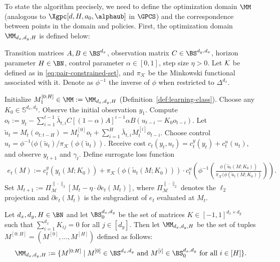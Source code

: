 To state the algorithm precisely, we need to define the optimization domain $\MM$ (analogous to $\Xgpc[d,H,a_0,\alphaub]$ in $\GPCS$) and the correspondence between points in the domain and policies. First, the optimization domain $\MM_{d_x,d_y,H}$ is defined below:


\begin{algorithm}[t]
\caption{$\GPCPOS$}
\label{alg:gpc-po}
\begin{algorithmic}[1]
\REQUIRE Transition matrices $A,B \in \BS^{d_x}$, observation matrix $C \in \BS^{d_y,d_x}$, horizon parameter $H \in \BN$, control parameter $\alpha\in[0,1]$, step size $\eta>0$.  Let $\mathcal{K}$ be defined as in \cref{eq:pair-constrained-set}, and $\pi_{\mathcal{K}}$ be the Minkowski functional associated with it.  
Denote as $\phi^{-1}$ the inverse of $\phi$ when restricted to $\Delta^{d_x}$.

\STATE Initialize $M_1^{[0:H]}\in \MM := \MM_{d_x,d_y,H}$ (Definition~\ref{def:learning-class}). Choose any $K_0\in\mathbb{S}^{d_x,d_y}$. \label{line:choose-k0}
\STATE Observe the initial observation $y_1$.
    \STATE Compute $o_t := y_t-\sum_{i=1}^{t-1}\bar{\lambda}_{t,i}C[(1-\alpha)A]^{i-1}\alpha B(u_{t-i}-K_0 o_{t-i})$. \label{line:compute-signal}
    \STATE Let $\tilde{u}_t=M_t(o_{t:t-H})=M_{t}^{[0]}o_t+\sum_{i=1}^H \bar{\lambda}_{t,i}M_{t}^{[i]}o_{t-i}$.\label{line:control-po-utot}
    \STATE Choose control $u_t=\phi^{-1}(\phi(\tilde{u}_t)/\pi_{\mathcal{K}}(\phi(\tilde{u}_t))$.\label{line:control-po}
    \STATE Receive cost $c_t(y_t,u_t)=c_t^y(y_t)+c_t^u(u_t)$, and observe $y_{t+1}$ and $\gamma_t$.
    \STATE Define surrogate loss function 
\begin{align*}
e_t(M) := c_t^y(y_t(M; K_0))+ \pi_{\mathcal{K}}(\phi(\tilde{u}_t(M;K_0))) \cdot c_t^u\left(\phi^{-1}\left(\frac{\phi(\tilde{u}_t(M;K_0))}{\pi_{\mathcal{K}}(\phi(\tilde{u}_t(M;K_0))}\right)\right).
\end{align*} \label{line:et-loss}
    \STATE Set $M_{t+1} := \Pi_{\mathcal{M}}^{\|\cdot\|_2}\left[M_t-\eta \cdot \partial e_t(M_t)\right]$, where $\Pi_{\mathcal{M}}^{\|\cdot\|_2}$ denotes the $\ell_2$ projection and $\partial e_t(M_t)$ is the subgradient of $e_t$ evaluated at $M_t$. \label{line:po-update}
\ENDFOR{}
\end{algorithmic}
\end{algorithm}


\begin{definition}  
\label{def:learning-class} 
Let $d_x,d_y,H \in \BN$ and let $\BS_{0}^{d_x,d_y}$ be the set of matrices $K\in[-1,1]^{d_x\times d_y}$ such that $\sum_{i=1}^{d_x} K_{ij} = 0$ for all $j \in [d_y]$. Then let $\MM_{d_x,d_y,H}$ be the set of tuples $M^{[0:H]} = (M^{[0]},\dots,M^{[H]})$ defined as follows:
\begin{align}
\label{eq:M-class}
\MM_{d_x,d_y,H} := \{M^{[0:H]}\mid M^{[0]}\in\BS^{d_x,d_y} \text{ and } M^{[i]}\in\BS_{0}^{d_x,d_y} \text{ for all }  i \in [H]\}.
\end{align}
\end{definition}

